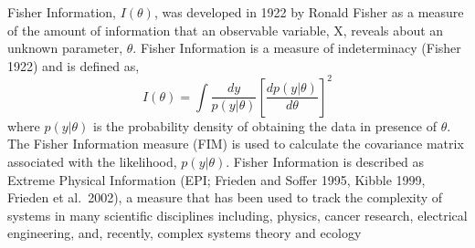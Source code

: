 \documentclass[12pt,twoside,openany]{reedthesis}
\begin{document}
Fisher Information, \(I(\theta)\), was developed in 1922 by Ronald Fisher as a measure of the amount of information that an observable variable, X, reveals about an unknown parameter, \(\theta\). Fisher Information is a measure of indeterminacy (Fisher 1922) and is defined as,
\begin{equation} 
I(\theta) = \int \frac{dy}{p(y|\theta)}\left[\frac{dp(y|\theta)}{d\theta}\right]^2
\label{eq:fiGeneral1922}
\end{equation}
where \(p(y|\theta)\) is the probability density of obtaining the data in presence of \(\theta\). The Fisher Information measure (FIM) is used to calculate the covariance matrix associated with the likelihood, \(p(y|\theta)\). Fisher Information is described as Extreme Physical Information (EPI; Frieden and Soffer 1995, Kibble 1999, Frieden et al.~2002), a measure that has been used to track the complexity of systems in many scientific disciplines including, physics, cancer research, electrical engineering, and, recently, complex systems theory and ecology
\end{document}

